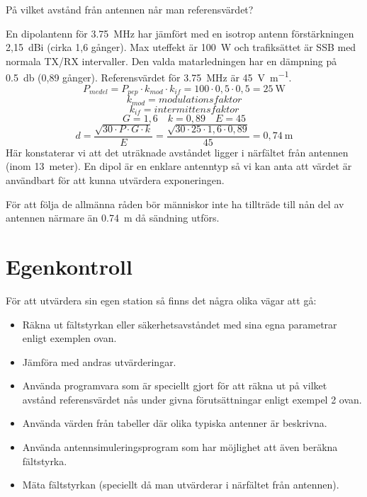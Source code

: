 På vilket avstånd från antennen når man referensvärdet?

En dipolantenn för \SI{3,75}{\mega\hertz} har jämfört med en isotrop antenn
förstärkningen 2,15~dBi (cirka 1,6 gånger).
Max uteffekt är \SI{100}{\watt} och trafiksättet är SSB med normala TX/RX
intervaller.
Den valda matarledningen har en dämpning på \SI{0,5}{\decibel} (0,89 gånger).
Referensvärdet för \SI{3,75}{\mega\hertz} är \SI{45}{\volt\per\metre}.
\[P_{medel} = P_{pep} \cdot k_{mod} \cdot k_{if}
= 100 \cdot 0,5 \cdot 0,5 = 25\ \mathrm{W}\]
\[k_{mod} = modulationsfaktor\]
\[k_{if} = intermittensfaktor\]
\[G = 1,6 \quad k = 0,89 \quad E = 45\]
\[d = \dfrac{\sqrt{30 \cdot P \cdot G \cdot k}}{E} = \dfrac{\sqrt{30 \cdot 25 \cdot 1,6 \cdot 0,89}}{45}
= 0,74\ \mathrm{m}\]
Här konstaterar vi att det uträknade avståndet ligger i närfältet från antennen
(inom 13~meter).
En dipol är en enklare antenntyp så vi kan anta att värdet är användbart för att
kunna utvärdera exponeringen.

För att följa de allmänna råden bör människor inte ha tillträde till nån del av
antennen närmare än \SI{0,74}{\metre} då sändning utförs.

\section{Egenkontroll}

För att utvärdera sin egen station så finns det några olika vägar att gå:

\begin{itemize}
\item Räkna ut fältstyrkan eller säkerhetsavståndet med sina egna
  parametrar enligt exemplen ovan.
\item Jämföra med andras utvärderingar.
\item Använda programvara som är speciellt gjort för att räkna ut på
  vilket avstånd referensvärdet nås under givna förutsättningar enligt
  exempel 2 ovan.
\item Använda värden från tabeller där olika typiska antenner är beskrivna.
\item Använda antennsimuleringsprogram som har möjlighet att även
  beräkna fältstyrka.
\item Mäta fältstyrkan (speciellt då man utvärderar i närfältet från
  antennen).
\end{itemize}


